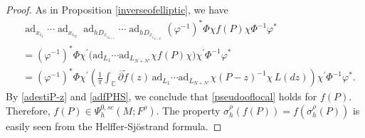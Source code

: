 \documentclass[10pt,a4paper]{amsart}
\newcommand\C{\ensuremath{\mathbb{C}}}
\newcommand\R{\ensuremath{\mathbb{R}}}
\begin{document}
\begin{proof}


As in Proposition \ref{inverseofelliptic}, we have
\begin{equation}\label{adfPHS}
\begin{aligned}
&\operatorname{ad}_{x_{i_1}} \cdots \operatorname{ad}_{x_{i_N}} \operatorname{ad}_{hD_{x_{i_{N+1}}}} \cdots \operatorname{ad}_{hD_{x_{i_{N+N^\prime}}}} (\varphi^{-1})^*\Phi \chi f(P)\chi\Phi^{-1}\varphi^*\\
&=(\varphi^{-1})^*\Phi \chi^{\prime} \big(\mathrm{ad}_{L_1}\cdots \mathrm{ad}_{L_{N+N'}} \chi f(P)\chi \big)\chi^{\prime}\Phi^{-1}\varphi^*\\
&= (\varphi^{-1})^*\Phi \chi^{\prime} \left(\frac{1}{\pi }\int_{\C}\overline{\partial}\widetilde{f}(z)\,\mathrm{ad}_{L_1}\cdots \mathrm{ad}_{L_{N+N'}} \chi (P-z)^{-1}\chi \,L(dz)\right)\chi^{\prime}\Phi^{-1}\varphi^*.
\end{aligned}
\end{equation}
By \eqref{adestiP-z} and \eqref{adfPHS}, we conclude that \eqref{pseudooflocal} holds for $f(P)$. Therefore, $f(P)\in \Psi^{0,sc}_{h}(M;F^\rho)$. The property $\sigma_{h}^{\rho}(f(P))=f(\sigma_{h}^{\rho}(P))$ is easily seen from the Helffer-Sj\"{o}strand formula.


\end{proof}
\end{document}
